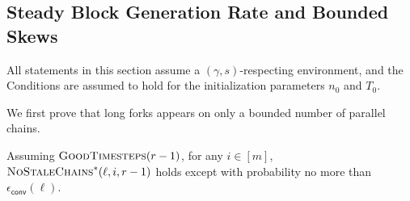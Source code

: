 \subsection{Steady Block Generation Rate and Bounded Skews}

All statements in this section assume a $(\gamma, s)$-respecting environment, and the Conditions are assumed to hold for the initialization parameters $n_0$ and $T_0$.

We first prove that long forks appears on only a bounded number of parallel chains.

\begin{lemma} \label{lemma:no-short-stale-chains}
    Assuming $\textsc{GoodTimesteps}(r - 1)$, for any $i \in [m]$, $\textsc{NoStaleChains}^\ast(\ell, i, r - 1)$ holds except with probability no more than $\epsilon_{\mathsf{conv}}(\ell)$.
\end{lemma}

